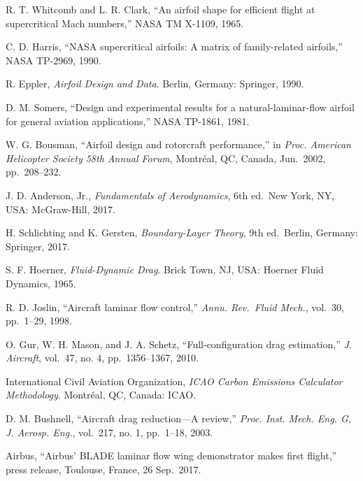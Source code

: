 \documentclass[10pt,a4paper,twocolumn]{article}
\begin{document}
\begin{list}{}{\setlength{\leftmargin}{2.2em}\setlength{\labelwidth}{2em}\setlength{\labelsep}{0.3em}\setlength{\itemsep}{1pt}\setlength{\parsep}{0pt}}
\item[{[13]}] R. T. Whitcomb and L. R. Clark, ``An airfoil shape for
efficient flight at supercritical Mach numbers,'' NASA TM X-1109, 1965.

\item[{[14]}] C. D. Harris, ``NASA supercritical airfoils: A matrix of
family-related airfoils,'' NASA TP-2969, 1990.

\item[{[15]}] R. Eppler, \emph{Airfoil Design and Data}. Berlin, Germany:
Springer, 1990.

\item[{[16]}] D. M. Somers, ``Design and experimental results for a
natural-laminar-flow airfoil for general aviation applications,'' NASA
TP-1861, 1981.

\item[{[17]}] W. G. Bousman, ``Airfoil design and rotorcraft performance,''
in \emph{Proc. American Helicopter Society 58th Annual Forum}, Montréal,
QC, Canada, Jun.~2002, pp.~208--232.

\item[{[18]}] J. D. Anderson, Jr., \emph{Fundamentals of Aerodynamics}, 6th
ed.~New York, NY, USA: McGraw-Hill, 2017.

\item[{[19]}] H. Schlichting and K. Gersten, \emph{Boundary-Layer Theory},
9th ed.~Berlin, Germany: Springer, 2017.

\item[{[20]}] S. F. Hoerner, \emph{Fluid-Dynamic Drag}. Brick Town, NJ, USA:
Hoerner Fluid Dynamics, 1965.

\item[{[21]}] R. D. Joslin, ``Aircraft laminar flow control,'' \emph{Annu.
Rev.~Fluid Mech.}, vol.~30, pp.~1--29, 1998.

\item[{[22]}] O. Gur, W. H. Mason, and J. A. Schetz, ``Full-configuration
drag estimation,'' \emph{J. Aircraft}, vol.~47, no. 4, pp.~1356--1367,
2010.

\item[{[23]}] International Civil Aviation Organization, \emph{ICAO Carbon
Emissions Calculator Methodology}. Montréal, QC, Canada: ICAO.

\item[{[24]}] D. M. Bushnell, ``Aircraft drag reduction---A review,''
\emph{Proc. Inst. Mech. Eng. G, J. Aerosp. Eng.}, vol.~217, no. 1,
pp.~1--18, 2003.

\item[{[25]}] Airbus, ``Airbus' BLADE laminar flow wing demonstrator makes
first flight,'' press release, Toulouse, France, 26 Sep.~2017.


\end{list}
\end{document}
